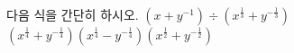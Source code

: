 다음 식을 간단히 하시오. 
 $(x+y^{-1})\div(x^{\frac{1}{3}}+y^{-\frac{1}{3}})$
 $(x^{\frac{1}{4}}+y^{-\frac{1}{4}})(x^{\frac{1}{4}}-y^{-\frac{1}{4}})(x^{\frac{1}{2}}+y^{-\frac{1}{2}})$
